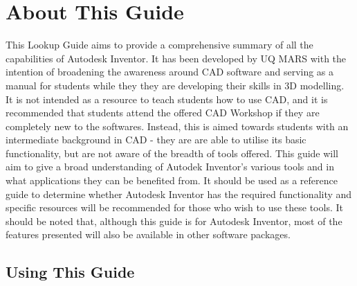 \section{About This Guide}

This Lookup Guide aims to provide a comprehensive summary of all the capabilities of Autodesk Inventor. It has been developed by UQ MARS with the intention of broadening the awareness around CAD software and serving as a manual for students while they they are developing their skills in 3D modelling. It is not intended as a resource to teach students how to use CAD, and it is recommended that students attend the offered CAD Workshop if they are completely new to the softwares. Instead, this is aimed towards students with an intermediate background in CAD - they are are able to utilise its basic functionality, but are not aware of the breadth of tools offered. This guide will aim to give a broad understanding of Autodek Inventor's various tools and in what applications they can be benefited from. It should be used as a reference guide to determine whether Autodesk Inventor has the required functionality and specific resources will be recommended for those who wish to use these tools. It should be noted that, although this guide is for Autodesk Inventor, most of the features presented will also be available in other software packages.

\subsection{Using This Guide}
